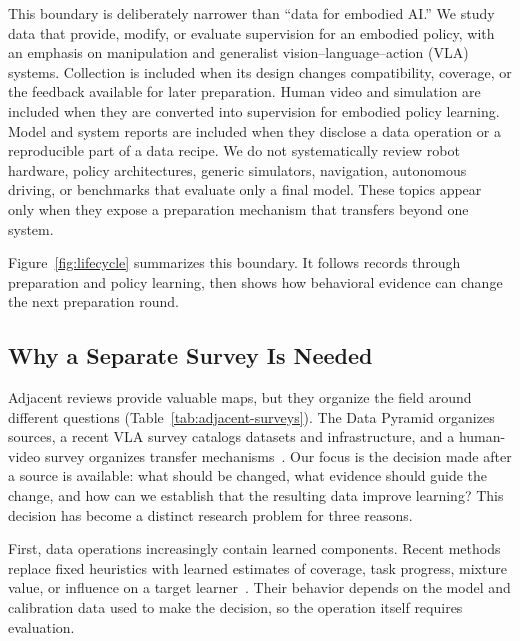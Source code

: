 This boundary is deliberately narrower than ``data for embodied AI.''
We study data that provide, modify, or evaluate supervision for an embodied policy, with an emphasis on manipulation and generalist vision--language--action (VLA) systems.
Collection is included when its design changes compatibility, coverage, or the feedback available for later preparation.
Human video and simulation are included when they are converted into supervision for embodied policy learning.
Model and system reports are included when they disclose a data operation or a reproducible part of a data recipe.
We do not systematically review robot hardware, policy architectures, generic simulators, navigation, autonomous driving, or benchmarks that evaluate only a final model.
These topics appear only when they expose a preparation mechanism that transfers beyond one system.

Figure~\ref{fig:lifecycle} summarizes this boundary.
It follows records through preparation and policy learning, then shows how behavioral evidence can change the next preparation round.



\subsection{Why a Separate Survey Is Needed}

Adjacent reviews provide valuable maps, but they organize the field around different questions (Table~\ref{tab:adjacent-surveys}).
The Data Pyramid organizes sources, a recent VLA survey catalogs datasets and infrastructure, and a human-video survey organizes transfer mechanisms~\cite{ye2026data_2607_24744,wang2026vision_2604_23001,ma2026robot_2604_27621}.
Our focus is the decision made after a source is available: what should be changed, what evidence should guide the change, and how can we establish that the resulting data improve learning?
This decision has become a distinct research problem for three reasons.

First, data operations increasingly contain learned components.
Recent methods replace fixed heuristics with learned estimates of coverage, task progress, mixture value, or influence on a target learner~\cite{hejna2024re_2408_14037,hejna2025robot_2502_08623,dass2025datamil_2505_09603,zhang2025scizor_2505_22626,xu2026athena_2606_16208}.
Their behavior depends on the model and calibration data used to make the decision, so the operation itself requires evaluation.

